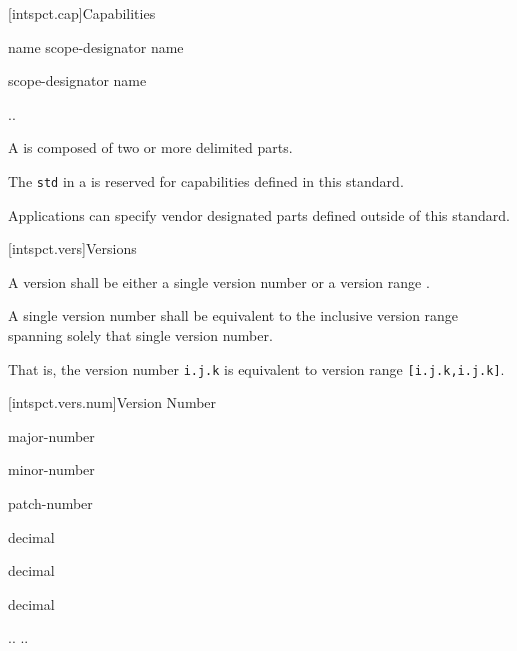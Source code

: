 [intspct.cap]{Capabilities}

\pnum
\begin{ncbnf}

\br
	name scope-designator name 

\br
	scope-designator name 

\br
	\br
	 ..  \br
	 

\br
	 

\end{ncbnf}

\pnum
A  is composed of two or more
 delimited  parts.

\pnum
The  \verb|std| in a  is
reserved for capabilities defined in this standard.

\pnum
Applications can specify vendor designated  parts defined
outside of this standard.

[intspct.vers]{Versions}

\pnum
A version shall be either a single version number  or a
version range .

\pnum
A single version number shall be equivalent to the inclusive version range
spanning solely that single version number.

\begin{note}
That is, the version number \verb|i.j.k| is equivalent to version range
\verb|[i.j.k,i.j.k]|.
\end{note}

[intspct.vers.num]{Version Number}

\pnum
\begin{ncbnf}

\br
	major-number 

\br
	  minor-number 

\br
	  patch-number

\br
	decimal

\br
	decimal

\br
	decimal

\br
	  ..   \br
	  ..  

\end{ncbnf}

